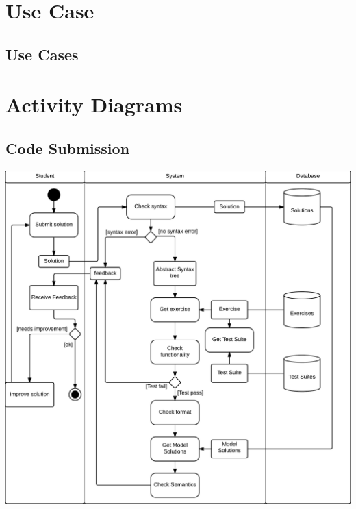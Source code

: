 \section{Use Case}


\subsection{Use Cases}

\section{Activity Diagrams}
\subsection{Code Submission}
\includegraphics[scale=0.8]{diagrams-images/code-submission-activity-diagram}

